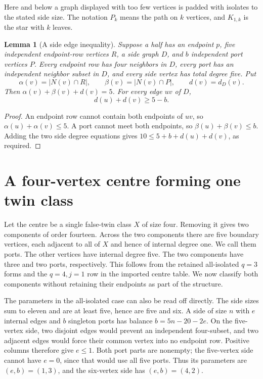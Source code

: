 \documentclass[11pt]{article}
\newtheorem{lemma}[theorem]{Lemma}
\begin{document}
Here and below a graph displayed with too few vertices is padded with
isolates to the stated side size. The notation $P_k$ means the path on
$k$ vertices, and $K_{1,k}$ is the star with $k$ leaves.

\begin{lemma}[A side edge inequality]\label{edgeineq}
Suppose a half has an endpoint $p$, five independent endpoint-row
vertices $R$, a side graph $D$, and $b$ independent port vertices $P$.
Every endpoint row has four neighbors in $D$, every port has an independent
neighbor subset in $D$, and every side vertex has total degree five.
Put
\[
 \alpha(v)=|N(v)\cap R|,\qquad
 \beta(v)=|N(v)\cap P|,\qquad d(v)=d_D(v).
\]
Then $\alpha(v)+\beta(v)+d(v)=5$. For every edge $uv$ of $D$,
\begin{equation}\label{edgeequation}
 d(u)+d(v)\geq5-b.
\end{equation}
\end{lemma}
\begin{proof}
An endpoint row cannot contain both endpoints of $uv$, so
$\alpha(u)+\alpha(v)\leq5$. A port cannot meet both endpoints, so
$\beta(u)+\beta(v)\leq b$. Adding the two side degree equations gives
$10\leq5+b+d(u)+d(v)$, as required.
\end{proof}

\section{A four-vertex centre forming one twin class}

Let the centre be a single false-twin class $X$ of size four. Removing
it gives two components of order fourteen. Across the two components
there are five boundary vertices, each adjacent to all of $X$ and hence
of internal degree one. We call them ports. The other vertices have
internal degree five. The two components have three and two ports,
respectively. This follows from the retained all-isolated $q=3$ forms
and the $q=4,j=1$ row in the imported centre table. We now classify both
components without retaining their endpoints as part of the structure.

The parameters in the all-isolated case can also be read off directly.
The side sizes sum to eleven and are at least five, hence are five and
six. A side of size $n$ with $e$ internal edges and $b$ singleton ports
has balance $b=5n-20-2e$. On the five-vertex side, two disjoint edges
would prevent an independent four-subset, and two adjacent edges would
force their common vertex into no endpoint row. Positive columns
therefore give $e\leq1$. Both port parts are nonempty; the five-vertex
side cannot have $e=0$, since that would use all five ports. Thus its
parameters are $(e,b)=(1,3)$, and the six-vertex side has $(e,b)=(4,2)$.
\end{document}
